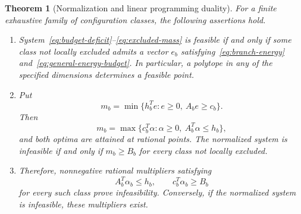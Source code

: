 \documentclass[11pt]{article}
\newtheorem{theorem}{Theorem}[section]
\theoremstyle{definition}
\theoremstyle{remark}
\numberwithin{equation}{section}
\begin{document}
\begin{theorem}[Normalization and linear programming duality]
\label{thm:budget-lift}\label{prop:general-energy-budget}
\label{thm:energy-normalization}\label{thm:energy-certificate}
\label{prop:capacity-complete}
For a finite exhaustive family of configuration classes, the
following assertions hold.
\begin{enumerate}[label=\textup{(\roman*)}]
\item System~\eqref{eq:budget-deficit}--\eqref{eq:excluded-mass} is
feasible if and only if some class not locally excluded admits a
vector $e_b$ satisfying~\eqref{eq:branch-energy}
and~\eqref{eq:general-energy-budget}. In particular, a polytope in
any of the specified dimensions determines a feasible point.
\item Put
\begin{equation}\label{eq:branch-minimum}
 m_b=\min\{h_b^Te:e\ge0,\ A_be\ge c_b\}.
\end{equation}
Then
\begin{equation}\label{eq:branch-duality}
 m_b=\max\{c_b^T\alpha:\alpha\ge0,\ A_b^T\alpha\le h_b\},
\end{equation}
and both optima are attained at rational points. The normalized
system is infeasible if and only if $m_b\ge B_b$ for every class
not locally excluded.
\item Therefore, nonnegative rational multipliers satisfying
\begin{equation}\label{eq:general-capacity-certificate}
               A_b^T\alpha_b\le h_b,\qquad
               c_b^T\alpha_b\ge B_b
\end{equation}
for every such class prove infeasibility. Conversely, if the
normalized system is infeasible, these multipliers exist.
\end{enumerate}
\end{theorem}
\end{document}
